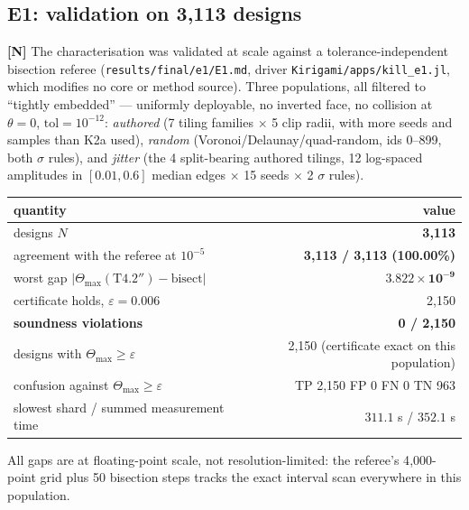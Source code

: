 \documentclass[11pt,a4paper]{article}
\theoremstyle{definition}
\newcommand{\Tmax}{\Theta_{\max}}
\newcommand{\file}[1]{\texttt{\small #1}}
\begin{document}
\subsection{E1: validation on 3{,}113 designs}
\label{sec:e1}

\textbf{[N]} The characterisation was validated at scale against a tolerance-independent
bisection referee (\file{results/final/e1/E1.md}, driver \file{Kirigami/apps/kill\_e1.jl}, which
modifies no core or method source). Three populations, all filtered to ``tightly embedded'' ---
uniformly deployable, no inverted face, no collision at $\theta=0$, $\mathrm{tol}=10^{-12}$:
\emph{authored} (7 tiling families $\times$ 5 clip radii, with more seeds and samples than
K2a used), \emph{random} (Voronoi/Delaunay/quad-random, ids 0--899, both $\sigma$ rules), and
\emph{jitter} (the 4 split-bearing authored tilings, 12 log-spaced amplitudes in
$[0.01,0.6]$ median edges $\times$ 15 seeds $\times$ 2 $\sigma$ rules).

\begin{center}
\small
\begin{tabular}{@{}lr@{}}
\toprule
quantity & value \\
\midrule
designs $N$ & \textbf{3{,}113} \\
agreement with the referee at $10^{-5}$ & \textbf{3{,}113 / 3{,}113 (100.00\%)} \\
worst gap $|\Tmax(\text{T4.2}'')-\text{bisect}|$ & $\mathbf{3.822\times10^{-9}}$ \\
certificate holds, $\varepsilon=0.006$ & 2{,}150 \\
\textbf{soundness violations} & \textbf{0 / 2{,}150} \\
designs with $\Tmax\ge\varepsilon$ & 2{,}150 (certificate exact on this population) \\
confusion against $\Tmax\ge\varepsilon$ & TP 2{,}150 \quad FP 0 \quad FN 0 \quad TN 963 \\
slowest shard / summed measurement time & $311.1$ s / $352.1$ s \\
\bottomrule
\end{tabular}
\end{center}

\noindent All gaps are at floating-point scale, not resolution-limited: the referee's
4{,}000-point grid plus 50 bisection steps tracks the exact interval scan everywhere in this
population.
\end{document}
